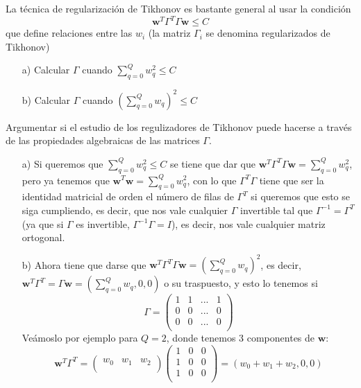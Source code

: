 \documentclass[12pt]{article}
\theoremstyle{definition}
\begin{document}
\begin{pregunta}
La técnica de regularización de Tikhonov es bastante general al usar la condición
\[		\mathbf{w}^T\Gamma^T\Gamma\mathbf{w} \leq C		\]
que define relaciones entre las $w_i$ (la matriz $\Gamma_i$ se denomina regularizados de Tikhonov)
\begin{enumerate}
\item[a)] Calcular $\Gamma$ cuando $\sum_{q=0}^Qw_q^2 \leq C$
\item[b)] Calcular $\Gamma$ cuando $(\sum_{q=0}^Qw_q)^2 \leq C$
\end{enumerate}
Argumentar si el estudio de los regulizadores de Tikhonov puede hacerse a través de las propiedades algebraicas de las matrices $\Gamma$.\\

\begin{enumerate}
\item[a)] Si queremos que $\sum_{q=0}^Q w_q^2 \leq C$ se tiene que dar que $\mathbf{w}^T\Gamma^T\Gamma\mathbf{w} = \sum_{q=0}^Q w_q^2$, pero ya tenemos que $\mathbf{w}^T\mathbf{w} = \sum_{q=0}^Q w_q^2$, con lo que $\Gamma^T\Gamma$ tiene que ser la identidad matricial de orden el número de filas de $\Gamma^T$ si queremos que esto se siga cumpliendo, es decir, que nos vale cualquier $\Gamma$ invertible tal que $\Gamma^{-1} = \Gamma^T$ (ya que si $\Gamma$ es invertible, $\Gamma^{-1}\Gamma = I$), es decir, nos vale cualquier matriz ortogonal.
\item[b)] Ahora tiene que darse que $\mathbf{w}^T\Gamma^T\Gamma\mathbf{w} = (\sum_{q=0}^Qw_q)^2$, es decir, $\mathbf{w}^T\Gamma^T = \Gamma\mathbf{w} = (\sum_{q=0}^Qw_q, 0, 0)$ o su traspuesto, y esto lo tenemos si 
\[ \Gamma = \left( \begin{array}{cccc}
		1 & 1 & ... & 1 \\
		0 & 0 & ... & 0\\
		0 & 0 & ... & 0 \\ \end{array} \right)
\]
Veámoslo por ejemplo para $Q=2$, donde tenemos 3 componentes de $\mathbf{w}$:
\[ \mathbf{w}^T\Gamma^T = \left( \begin{array}{ccc}
	w_0 & w_1 & w_2 \\ \end{array} \right)
	\left( \begin{array}{ccc}
		1 & 0 & 0 \\
		1 & 0 & 0\\
		1 & 0 & 0 \\ \end{array} \right) = (w_0+w_1+w_2, 0, 0)
\]
\end{enumerate}
\end{pregunta}
\end{document}
